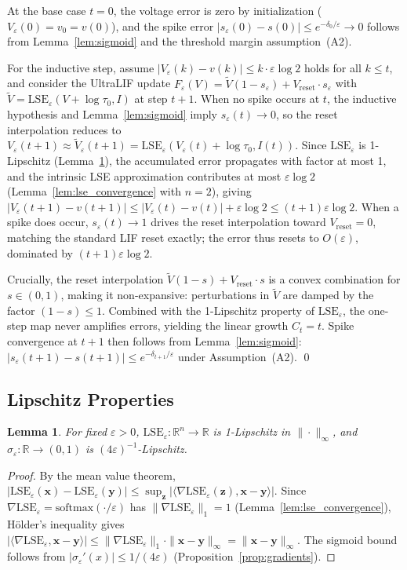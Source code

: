 \documentclass{article}
\theoremstyle{plain}
\newtheorem{lemma}[theorem]{Lemma}
\theoremstyle{definition}
\theoremstyle{remark}
\newcommand{\lse}{\mathrm{LSE}}
\newcommand{\R}{\mathbb{R}}
\newcommand{\eps}{\varepsilon}
\begin{document}
At the base case $t=0$, the voltage error is zero by initialization ($V_\eps(0) = v_0 = v(0)$), and the spike error $|s_\eps(0) - s(0)| \leq e^{-\delta_0/\eps} \to 0$ follows from Lemma~\ref{lem:sigmoid} and the threshold margin assumption~(A2).

For the inductive step, assume $|V_\eps(k) - v(k)| \leq k \cdot \eps \log 2$ holds for all $k \leq t$, and consider the UltraLIF update $F_\eps(V) = \tilde{V}(1 - s_\eps) + V_\mathrm{reset} \cdot s_\eps$ with $\tilde{V} = \lse_\eps(V + \log\tau_0, I)$ at step $t+1$. When no spike occurs at $t$, the inductive hypothesis and Lemma~\ref{lem:sigmoid} imply $s_\eps(t) \to 0$, so the reset interpolation reduces to $V_\eps(t+1) \approx \tilde{V}_\eps(t+1) = \lse_\eps(V_\eps(t) + \log\tau_0, I(t))$. Since $\lse_\eps$ is 1-Lipschitz (Lemma~\ref{lem:lipschitz}), the accumulated error propagates with factor at most 1, and the intrinsic LSE approximation contributes at most $\eps \log 2$ (Lemma~\ref{lem:lse_convergence} with $n=2$), giving $|V_\eps(t{+}1) - v(t{+}1)| \leq |V_\eps(t) - v(t)| + \eps\log 2 \leq (t{+}1)\eps\log 2$. When a spike does occur, $s_\eps(t) \to 1$ drives the reset interpolation toward $V_\mathrm{reset} = 0$, matching the standard LIF reset exactly; the error thus resets to $O(\eps)$, dominated by $(t{+}1)\eps\log 2$.

Crucially, the reset interpolation $\tilde{V}(1-s) + V_\mathrm{reset} \cdot s$ is a convex combination for $s \in (0,1)$, making it non-expansive: perturbations in $\tilde{V}$ are damped by the factor $(1-s) \leq 1$. Combined with the 1-Lipschitz property of $\lse_\eps$, the one-step map never amplifies errors, yielding the linear growth $C_t = t$. Spike convergence at $t+1$ then follows from Lemma~\ref{lem:sigmoid}: $|s_\eps(t{+}1) - s(t{+}1)| \leq e^{-\delta_{t+1}/\eps}$ under Assumption~(A2). \qed

\subsection{Lipschitz Properties}

\begin{lemma}
\label{lem:lipschitz}
For fixed $\eps > 0$, $\lse_\eps: \R^n \to \R$ is 1-Lipschitz in $\|\cdot\|_\infty$, and $\sigma_\eps: \R \to (0,1)$ is $(4\eps)^{-1}$-Lipschitz.
\end{lemma}

\begin{proof}
By the mean value theorem, $|\lse_\eps(\mathbf{x}) - \lse_\eps(\mathbf{y})| \leq \sup_\mathbf{z} |\langle \nabla \lse_\eps(\mathbf{z}), \mathbf{x} - \mathbf{y}\rangle|$. Since $\nabla \lse_\eps = \mathrm{softmax}(\cdot/\eps)$ has $\|\nabla \lse_\eps\|_1 = 1$ (Lemma~\ref{lem:lse_convergence}), H\"older's inequality gives $|\langle \nabla \lse_\eps, \mathbf{x} - \mathbf{y}\rangle| \leq \|\nabla \lse_\eps\|_1 \cdot \|\mathbf{x} - \mathbf{y}\|_\infty = \|\mathbf{x} - \mathbf{y}\|_\infty$. The sigmoid bound follows from $|\sigma_\eps'(x)| \leq 1/(4\eps)$ (Proposition~\ref{prop:gradients}).
\end{proof}
\end{document}
